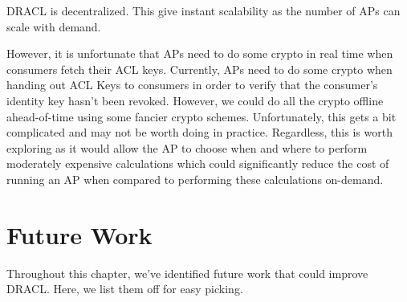 \documentclass[pdftex,12pt,a4papaer,twoside,notitlepage]{report}
\begin{document}
DRACL is decentralized. This give instant scalability as the number of APs can
scale with demand.

However, it is unfortunate that APs need to do some crypto in real time when
consumers fetch their ACL keys. Currently, APs need to do some crypto when
handing out ACL Keys to consumers in order to verify that the consumer's
identity key hasn't been revoked. However, we could do all the crypto offline
ahead-of-time using some fancier crypto schemes. Unfortunately, this gets a bit
complicated and may not be worth doing in practice. Regardless, this is worth
exploring as it would allow the AP to choose when and where to perform
moderately expensive calculations which could significantly reduce the cost of
running an AP when compared to performing these calculations on-demand.

\section{Future Work}

Throughout this chapter, we've identified future work that could improve DRACL.
Here, we list them off for easy picking.
\end{document}
